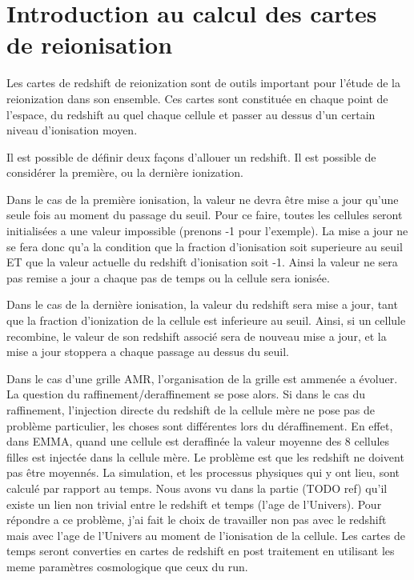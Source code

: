 \chapter{Introduction au calcul des cartes de reionisation}


Les cartes de redshift de reionization sont de outils important pour l'étude de la reionization dans son ensemble.
Ces cartes sont constituée en chaque point de l'espace, du redshift au quel chaque cellule et passer au dessus d'un certain niveau d'ionisation moyen.

Il est possible de définir deux façons d'allouer un redshift.
Il est possible de considérer la première, ou la dernière ionization.

Dans le cas de la première ionisation, la valeur ne devra être mise a jour qu'une seule fois au moment du passage du seuil.
Pour ce faire, toutes les cellules seront initialisées a une valeur impossible (prenons -1 pour l'exemple).
La mise a jour ne se fera donc qu'a la condition que la fraction d'ionisation soit superieure au seuil ET que la valeur actuelle du redshift d'ionisation soit -1.
Ainsi la valeur ne sera pas remise a jour a chaque pas de temps ou la cellule sera ionisée. 

Dans le cas de la dernière ionisation, la valeur du redshift sera mise a jour, tant que la fraction d'ionization de la cellule est inferieure au seuil.
Ainsi, si un cellule recombine, le valeur de son redshift associé sera de nouveau mise a jour, et la mise a jour stoppera a chaque passage au dessus du seuil.


Dans le cas d'une grille AMR, l'organisation de la grille est ammenée a évoluer.
La question du raffinement/deraffinement  se pose alors.
Si dans le cas du raffinement, l'injection directe du redshift de la cellule mère ne pose pas de problème particulier, les choses sont différentes lors du déraffinement.
En effet, dans EMMA, quand une cellule est deraffinée la valeur moyenne des 8 cellules filles est injectée dans la cellule mère.
Le problème est que les redshift ne doivent pas être moyennés.
La simulation, et les processus physiques qui y ont lieu, sont calculé par rapport au temps.
Nous avons vu dans la partie (TODO ref) qu'il existe un lien non trivial entre le redshift et temps (l'age de l'Univers).
Pour répondre a ce problème, j'ai fait le choix de travailler non pas avec le redshift mais avec l'age de l'Univers au moment de l'ionisation de la cellule.
Les cartes de temps seront converties en cartes de redshift en post traitement en utilisant les meme paramètres cosmologique que ceux du run.



